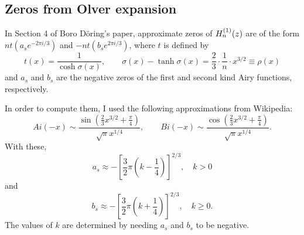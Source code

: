 \subsection{Zeros from Olver expansion}

In Section 4 of Boro D\"oring's paper, 
approximate zeros of $H_n^{(1)}(z)$ are of the form
$nt(a_se^{-2\pi i/3})$ and $-nt(b_se^{2\pi i/3})$, where
$t$ is defined by
\[
 t(x) = \frac{1}{\cosh\sigma(x)}, \qquad
 \sigma(x) - \tanh\sigma(x) = \frac23 \cdot \frac1n \cdot
 x^{3/2} \equiv \rho(x)
\]
and $a_s$ and $b_s$ are the negative zeros of the
first and second kind Airy functions, respectively.

In order to compute them, I used the following 
approximations from Wikipedia:
\[
 Ai(-x) 
 \sim 
 \frac{\sin\left(\frac23 x^{3/2} + \frac{\pi}{4}\right)}
      {\sqrt{\pi} x^{1/4}},
 \qquad
 Bi(-x) 
 \sim 
 \frac{\cos\left(\frac23 x^{3/2} + \frac{\pi}{4}\right)}
      {\sqrt{\pi} x^{1/4}}.
\]
With these,
\[
 a_s \approx -\left[ \frac32 \pi \left(k-\frac14\right)
              \right]^{2/3}, 
 \quad k > 0
\]
and
\[
 b_s \approx -\left[ \frac32 \pi \left(k+\frac14\right)
              \right]^{2/3}, 
 \quad k \ge 0.
\]
The values of $k$ are determined by needing $a_s$ and
$b_s$ to be negative.

